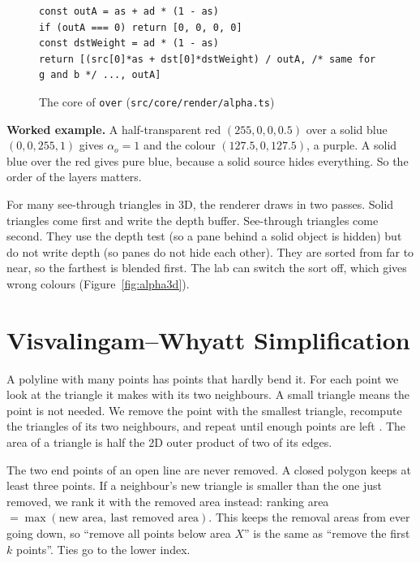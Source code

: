 \begin{figure}[H]
\centering
\begin{lstlisting}[style=code]
const outA = as + ad * (1 - as)
if (outA === 0) return [0, 0, 0, 0]
const dstWeight = ad * (1 - as)
return [(src[0]*as + dst[0]*dstWeight) / outA, /* same for g and b */ ..., outA]
\end{lstlisting}
\caption{The core of \texttt{over} (\texttt{src/core/render/alpha.ts})}
\label{fig:overcode}
\end{figure}

\textbf{Worked example.} A half-transparent red $(255,0,0,0.5)$ over a solid blue $(0,0,255,1)$ gives $\alpha_o=1$ and the colour $(127.5,0,127.5)$, a purple. A solid blue over the red gives pure blue, because a solid source hides everything. So the order of the layers matters.

For many see-through triangles in 3D, the renderer draws in two passes. Solid triangles come first and write the depth buffer. See-through triangles come second. They use the depth test (so a pane behind a solid object is hidden) but do not write depth (so panes do not hide each other). They are sorted from far to near, so the farthest is blended first. The lab can switch the sort off, which gives wrong colours (Figure~\ref{fig:alpha3d}).


\section{Visvalingam--Whyatt Simplification}
A polyline with many points has points that hardly bend it. For each point we look at the triangle it makes with its two neighbours. A small triangle means the point is not needed. We remove the point with the smallest triangle, recompute the triangles of its two neighbours, and repeat until enough points are left \cite{visvalingam1993}. The area of a triangle is half the 2D outer product of two of its edges.

The two end points of an open line are never removed. A closed polygon keeps at least three points. If a neighbour's new triangle is smaller than the one just removed, we rank it with the removed area instead: ranking area $=\max(\text{new area},\ \text{last removed area})$. This keeps the removal areas from ever going down, so ``remove all points below area $X$'' is the same as ``remove the first $k$ points''. Ties go to the lower index.

